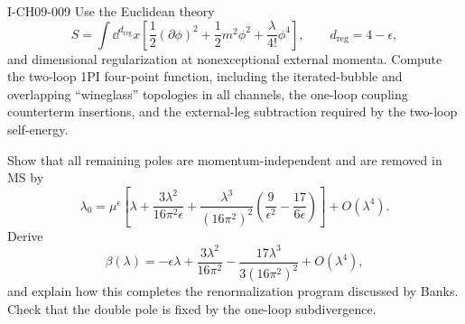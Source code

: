 \begin{exercise}{I-CH09-009}
Use the Euclidean theory
\[
  S=\int\dd^{d_{\mathrm{reg}}}x\left[\frac12(\partial\phi)^2+\frac12m^2\phi^2
  +\frac{\lambda}{4!}\phi^4\right],
  \qquad d_{\mathrm{reg}}=4-\epsilon,
\]
and dimensional regularization at nonexceptional external momenta.  Compute
the two-loop 1PI four-point function, including the iterated-bubble and
overlapping ``wineglass'' topologies in all channels, the one-loop coupling
counterterm insertions, and the external-leg subtraction required by the
two-loop self-energy.

Show that all remaining poles are momentum-independent and are removed in MS
by
\[
  \lambda_0=\mu^\epsilon\left[
  \lambda+\frac{3\lambda^2}{16\pi^2\epsilon}
  +\frac{\lambda^3}{(16\pi^2)^2}
  \left(\frac{9}{\epsilon^2}-\frac{17}{6\epsilon}\right)
  \right]+O(\lambda^4).
\]
Derive
\[
  \beta(\lambda)=-\epsilon\lambda+\frac{3\lambda^2}{16\pi^2}
  -\frac{17\lambda^3}{3(16\pi^2)^2}+O(\lambda^4),
\]
and explain how this completes the renormalization program discussed by Banks.
Check that the double pole is fixed by the one-loop subdivergence.
\end{exercise}

